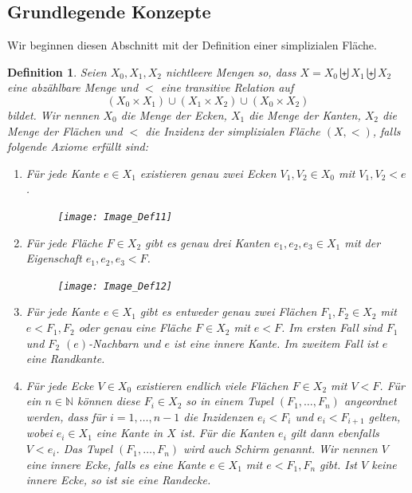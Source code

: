 \documentclass[12pt,titlepage,twoside,cleardoublepage]{article}
\theoremstyle{nummermitklammern}
\newtheorem{definition}[temp]{Definition}
\newtheorem{definition}[zahl]{Definition}
\numberwithin{equation}{section}
\begin{document}
\subsection{Grundlegende Konzepte}
Wir beginnen diesen Abschnitt mit der Definition einer simplizialen Fläche.
\begin{definition}  \label{def1} 
Seien $X_0,X_1,X_2$ nichtleere Mengen so, dass $X=X_{0} \biguplus X_{1} \biguplus X_{2}$ eine abzählbare Menge und $<$ eine transitive Relation auf   
\[
(X_{0}\times X_{1}) \cup (X_{1}\times X_{2})\cup (X_{0}\times X_{2})
\]
 bildet.
 Wir nennen $X_{0}$ \emph{die Menge der Ecken}, $X_{1}$ \emph{die Menge der Kanten}, $X_{2}$ \emph{die Menge der Flächen} und $<$ die \emph{Inzidenz} der \emph{simplizialen Fläche} $(X,<)$, falls folgende Axiome erfüllt sind:
 \begin{enumerate}
\item Für jede Kante $e \in X_{1}$ existieren genau zwei Ecken $V_1,V_2 \in X_{0}$ mit $V_1,V_2 < e$. 
\begin{figure}[H]
\begin{center}
\texttt{[image: Image\_Def11]}
\end{center}
\end{figure}
\item Für jede Fläche $F\in X_2$ gibt es genau drei Kanten $e_1,e_2,e_3 \in X_{1}$ mit der Eigenschaft $e_1,e_2,e_3 < F$.
\begin{figure}[H]
\begin{center}
\texttt{[image: Image\_Def12]}
\end{center}
\end{figure} 
\item Für jede Kante $e \in X_{1}$ gibt es entweder genau zwei Flächen $F_{1},F_{2} \in X_{2}$ mit $e <F_{1},F_2$ oder
genau eine Fläche $F \in X_{2}$ mit $e < F$. Im ersten Fall sind $F_{1}$ und $F_{2}$ \emph{$(e)$-Nachbarn} und $e$ ist eine \emph{innere Kante}. Im zweitem Fall ist $e$ eine \emph{Randkante}. 
 \item Für jede Ecke $V \in X_{0}$ existieren endlich viele Flächen $F\in X_{2}$ mit $V < F$.
  Für ein $n\in \mathbb{N}$ können diese $F_{i}\in X_2$ so in einem Tupel $(F_{1},\ldots,F_{n})$ angeordnet werden, dass für $i=1,\ldots,n-1$  die Inzidenzen $e_i<F_{i}$ und $e_i<F_{i+1}$ gelten, wobei $e_i\in X_1$ eine Kante  in $X$ ist. Für die Kanten $e_i$ gilt dann ebenfalls $V<e_i$. 
  Das Tupel $(F_1,\ldots,F_n)$ wird auch \emph{Schirm} genannt. Wir nennen $V$ eine \emph{innere Ecke}, falls es eine Kante $e\in X_1$ mit $e<F_{1},F_{n}$ gibt. Ist $V$ keine innere Ecke, so ist sie eine \emph{Randecke}.

\end{enumerate}
\end{definition}
\end{document}
